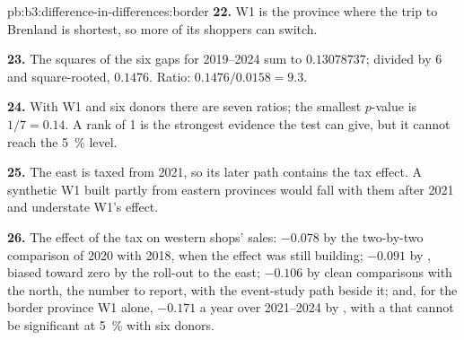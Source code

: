 \begin{solution}{pb:b3:difference-in-differences:border}
\textbf{22.} W1 is the province where the trip to Brenland is shortest, so more
of its shoppers can switch.

\textbf{23.} The squares of the six gaps for 2019--2024 sum to $0.13078737$;
divided by 6 and square-rooted, $0.1476$. Ratio: $0.1476/0.0158 = 9.3$.

\textbf{24.} With W1 and six donors there are seven ratios; the smallest
$p$-value is $1/7 = 0.14$. A rank of 1 is the strongest evidence the test can
give, but it cannot reach the 5~\% level.

\textbf{25.} The east is taxed from 2021, so its later path contains the tax
effect. A synthetic W1 built partly from eastern provinces would fall with
them after 2021 and understate W1's effect.

\textbf{26.} The effect of the tax on western shops' sales: $-0.078$ by the
two-by-two comparison of 2020 with 2018, when the effect was still building;
$-0.091$ by , biased toward zero by the roll-out to the
east; $-0.106$ by clean comparisons with the north, the number to report, with
the event-study path beside it; and, for the border province W1 alone,
$-0.171$ a year over 2021--2024 by , with a  that
cannot be significant at 5~\% with six donors.
\end{solution}
